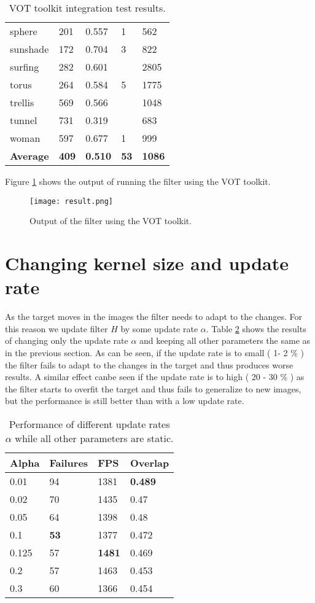 \documentclass[9pt]{IEEEtran}
\begin{document}
\begin{table}[!ht]
\begin{tabular}{lllll}
        sphere & 201 & 0.557 & 1 & 562 \\ 
        sunshade & 172 & 0.704 & 3 & 822 \\ 
        surfing & 282 & 0.601 & ~ & 2805 \\ 
        torus & 264 & 0.584 & 5 & 1775 \\ 
        trellis & 569 & 0.566 & ~ & 1048 \\ 
        tunnel & 731 & 0.319 & ~ & 683 \\ 
        woman & 597 & 0.677 & 1 & 999 \\ \hline \hline
        \textbf{Average} & \textbf{409} & \textbf{0.510} & \textbf{53} & \textbf{1086}\\ 
    \end{tabular}
    \caption{VOT toolkit integration test results.}
    \label{basic:implementation}
\end{table}
Figure \ref*{fig:output} shows the output of running the filter using the VOT toolkit.
\begin{figure}[!ht]
    \centering
    \texttt{[image: result.png]}
    \caption{Output of the filter using the VOT toolkit.}
    \label{fig:output}
\end{figure}


\section{Changing kernel size and update rate}
As the target moves in the images the filter needs to adapt to the changes.
For this reason we update filter $H$ by some update rate $\alpha$.
Table \ref*{label:alpha} shows the results of changing only the update rate $\alpha$ and keeping all other parameters the same as in the previous section.
As can be seen, if the update rate is to small ( 1- 2 \% ) the filter fails to adapt to the changes in the target and thus produces worse results.
A similar effect canbe seen if the update rate is to high ( 20 - 30 \% ) as the filter starts to overfit the target and thus fails to generalize to new images, but the performance is still better than with a low update rate.
\begin{table}[!ht]
    \centering
    \begin{tabular}{llll}
        \textbf{Alpha} & \textbf{Failures} & \textbf{FPS} & \textbf{Overlap} \\ \hline
        0.01 & 94 & 1381 & \textbf{0.489} \\ 
        0.02 & 70 & 1435 & 0.47 \\ 
        0.05 & 64 & 1398 & 0.48 \\ 
        0.1 & \textbf{53} & 1377 & 0.472 \\ 
        0.125 & 57 & \textbf{1481} & 0.469 \\ 
        0.2 & 57 & 1463 & 0.453 \\ 
        0.3 & 60 & 1366 & 0.454 \\ 
    \end{tabular}
    \caption{Performance of different update rates $\alpha$ while all other parameters are static.}
    \label{label:alpha}
\end{table}
\end{document}

